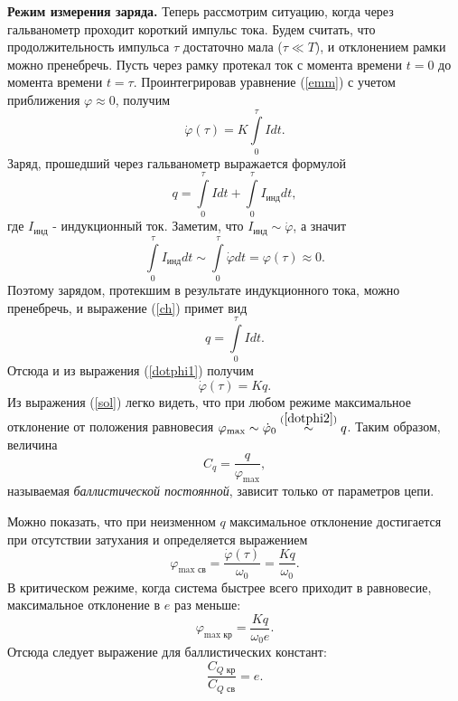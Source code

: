 \documentclass[12pt,a4paper]{article}
\begin{document}
\textbf{Режим измерения заряда.} Теперь рассмотрим ситуацию, когда через гальванометр проходит короткий импульс тока. Будем считать, что продолжительность импульса $\tau$ достаточно мала ($\tau \ll T$), и отклонением рамки можно пренебречь. Пусть через рамку протекал ток с момента времени $t = 0$ до момента времени $t = \tau$. Проинтегрировав уравнение (\ref{emm}) с учетом приближения $\varphi \approx 0$, получим
\begin{equation}
\dot\varphi(\tau) = K\int\limits_0^\tau Idt\label{dotphi1}.
\end{equation}
Заряд, прошедший через гальванометр выражается формулой
\begin{equation}
q = \int\limits_0^\tau Idt + \int\limits_0^\tau I_{\text{инд}}dt\label{ch},
\end{equation}
где $I_{\text{инд}}$ - индукционный ток. Заметим, что $I_{\text{инд}} \sim \dot\varphi$, а значит
\begin{equation}
\int\limits_0^\tau I_{\text{инд}}dt \sim \int\limits_0^\tau \dot\varphi dt = \varphi(\tau) \approx 0.
\end{equation}
Поэтому зарядом, протекшим в результате индукционного тока, можно пренебречь, и выражение (\ref{ch}) примет вид
\begin{equation}
q = \int\limits_0^\tau Idt.
\end{equation}
Отсюда и из выражения (\ref{dotphi1}) получим
\begin{equation}
\dot\varphi(\tau) = Kq\label{dotphi2}.
\end{equation}
Из выражения (\ref{sol}) легко видеть, что при любом режиме максимальное отклонение от положения равновесия $\varphi_\text{max} \sim \dot\varphi_0 \stackrel{(\ref{dotphi2})}{\sim} q$. Таким образом, величина
\begin{equation}
C_q = \frac{q}{\varphi_\text{max}}\label{bal},
\end{equation}
называемая \textit{баллистической постоянной}, зависит только от параметров цепи.

Можно показать, что при неизменном $q$ максимальное отклонение достигается при отсутствии затухания и определяется выражением
\begin{equation}
\varphi_{\text{max св}} = \frac{\dot\varphi(\tau)}{\omega_0} = \frac{Kq}{\omega_0}\label{fr}.
\end{equation}
В критическом режиме, когда система быстрее всего приходит в равновесие, максимальное отклонение в $e$ раз меньше:
\begin{equation}
\varphi_{\text{max кр}} = \frac{Kq}{\omega_0e}\label{cr}.
\end{equation}
Отсюда следует выражение для баллистических констант:
\begin{equation}
\frac{C_{Q\text{ кр}}}{C_{Q\text{ св}}} = e\label{rat}.
\end{equation}
\end{document}
